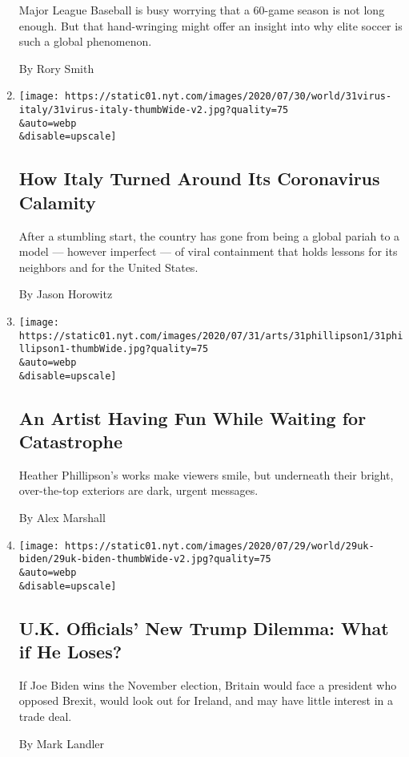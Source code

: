 \begin{enumerate}
  Major League Baseball is busy worrying that a 60-game season is not
  long enough. But that hand-wringing might offer an insight into why
  elite soccer is such a global phenomenon.

  By Rory Smith
\item
  \href{/2020/07/31/world/europe/italy-coronavirus-reopening.html}{}

  \texttt{[image: https://static01.nyt.com/images/2020/07/30/world/31virus-italy/31virus-italy-thumbWide-v2.jpg?quality=75\\\&auto=webp\\\&disable=upscale]}

  \hypertarget{how-italy-turned-around-its-coronavirus-calamity}{%
  \subsection{How Italy Turned Around Its Coronavirus
  Calamity}\label{how-italy-turned-around-its-coronavirus-calamity}}

  After a stumbling start, the country has gone from being a global
  pariah to a model --- however imperfect --- of viral containment that
  holds lessons for its neighbors and for the United States.

  By Jason Horowitz
\item
  \href{/2020/07/31/arts/design/heather-phillipson-fourth-plinth.html}{}

  \texttt{[image: https://static01.nyt.com/images/2020/07/31/arts/31phillipson1/31phillipson1-thumbWide.jpg?quality=75\\\&auto=webp\\\&disable=upscale]}

  \hypertarget{an-artist-having-fun-while-waiting-for-catastrophe}{%
  \subsection{An Artist Having Fun While Waiting for
  Catastrophe}\label{an-artist-having-fun-while-waiting-for-catastrophe}}

  Heather Phillipson's works make viewers smile, but underneath their
  bright, over-the-top exteriors are dark, urgent messages.

  By Alex Marshall
\item
  \href{/2020/07/31/world/europe/britain-biden-presidency-johnson.html}{}

  \texttt{[image: https://static01.nyt.com/images/2020/07/29/world/29uk-biden/29uk-biden-thumbWide-v2.jpg?quality=75\\\&auto=webp\\\&disable=upscale]}

  \hypertarget{uk-officials-new-trump-dilemma-what-if-he-loses}{%
  \subsection{U.K. Officials' New Trump Dilemma: What if He
  Loses?}\label{uk-officials-new-trump-dilemma-what-if-he-loses}}

  If Joe Biden wins the November election, Britain would face a
  president who opposed Brexit, would look out for Ireland, and may have
  little interest in a trade deal.

  By Mark Landler
\end{enumerate}

